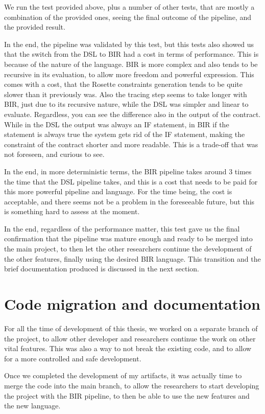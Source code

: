 We run the test provided above, plus a number of other tests, that are mostly a combination
of the provided ones, seeing the final outcome of the pipeline, and the provided
result.

In the end, the pipeline was validated by this test, but this tests also showed us
that the switch from the DSL to BIR had a cost in terms of performance. This is
because of the nature of the language. BIR is more complex and also tends to be recursive
in its evaluation, to allow more freedom and powerful expression. This comes with
a cost, that the Rosette constraints generation tends to be quite slower than it
previously was. Also the tracing step seems to take longer with BIR, just due to
its recursive nature, while the DSL was simpler and linear to evaluate.
Regardless, you can see the difference also in the output of the contract. While
in the DSL the output was always an IF statement, in BIR if the statement is always
true the system gets rid of the IF statement, making the constraint of the
contract shorter and more readable. This is a trade-off that was not foreseen,
and curious to see.

In the end, in more deterministic terms, the BIR pipeline takes around 3 times
the time that the DSL pipeline takes, and this is a cost that needs to be paid for
this more powerful pipeline and language. For the time being, the cost is acceptable,
and there seems not be a problem in the foreseeable future, but this is something
hard to assess at the moment.

In the end, regardless of the performance matter, this test gave us the final confirmation
that the pipeline was mature enough and ready to be merged into the main project,
to then let the other researchers continue the development of the other features,
finally using the desired BIR language. This transition and the brief
documentation produced is discussed in the next section.

\section{Code migration and documentation}
\label{cha:Code migration and documentation} For all the time of development of
this thesis, we worked on a separate branch of the project, to allow other
developer and researchers continue the work on other vital features. This was also
a way to not break the existing code, and to allow for a more controlled and
safe development.

Once we completed the development of my artifacts, it was actually time to merge
the code into the main branch, to allow the researchers to start developing the
project with the BIR pipeline, to then be able to use the new features and the new
language.

